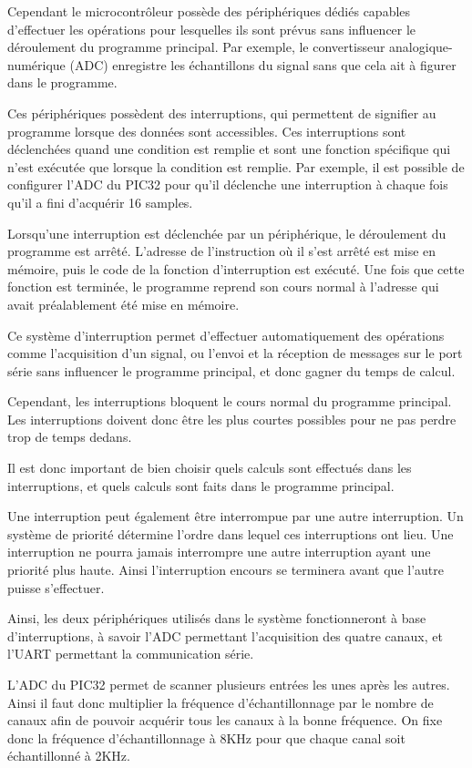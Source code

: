 \documentclass[letterpaper, twoside, 12pt, memoire, creativecommons, hyperref]{thETS}
\begin{document}
Cependant le microcontrôleur possède des périphériques dédiés capables d'effectuer les opérations pour lesquelles ils sont prévus sans influencer le déroulement du programme principal. Par exemple, le convertisseur analogique-numérique (ADC) enregistre les échantillons du signal sans que cela ait à figurer dans le programme. 

Ces périphériques possèdent des interruptions, qui permettent de signifier au programme lorsque des données sont accessibles. Ces interruptions sont déclenchées quand une condition est remplie et sont une fonction spécifique qui n'est exécutée que lorsque la condition est remplie. Par exemple, il est possible de configurer l'ADC du PIC32 pour qu'il déclenche une interruption à chaque fois qu'il a fini d'acquérir 16 samples. 

Lorsqu'une interruption est déclenchée par un périphérique, le déroulement du programme est arrêté. L'adresse de l'instruction où il s'est arrêté est mise en mémoire, puis le code de la fonction d'interruption est exécuté. Une fois que cette fonction est terminée, le programme reprend son cours normal à l'adresse qui avait préalablement été mise en mémoire. 

Ce système d'interruption permet d'effectuer automatiquement des opérations comme l'acquisition d'un signal, ou l'envoi et la réception de messages sur le port série sans influencer le programme principal, et donc gagner du temps de calcul. 

Cependant, les interruptions bloquent le cours normal du programme principal. Les interruptions doivent donc être les plus courtes possibles pour ne pas perdre trop de temps dedans. 

Il est donc important de bien choisir quels calculs sont effectués dans les interruptions, et quels calculs sont faits dans le programme principal. 

Une interruption peut également être interrompue par une autre interruption. Un système de priorité détermine l'ordre dans lequel ces interruptions ont lieu. Une interruption ne pourra jamais interrompre une autre interruption ayant une priorité plus haute. Ainsi l'interruption encours se terminera avant que l'autre puisse s'effectuer. 

Ainsi, les deux périphériques utilisés dans le système fonctionneront à base d'interruptions, à savoir l'ADC permettant l'acquisition des quatre canaux, et l'UART permettant la communication série. 

L'ADC du PIC32 permet de scanner plusieurs entrées les unes après les autres. Ainsi il faut donc multiplier la fréquence d'échantillonnage par le nombre de canaux afin de pouvoir acquérir tous les canaux à la bonne fréquence. On fixe donc la fréquence d'échantillonnage à 8KHz pour que chaque canal soit échantillonné à 2KHz. 
\end{document}
